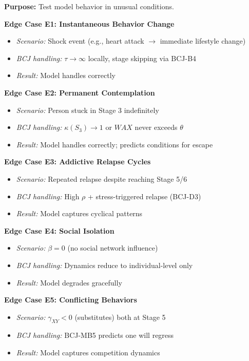 \begin{tcolorbox}[colback=gray!5!white, colframe=gray!75!black,
    title=Validation V7: Edge Cases]
\textbf{Purpose:} Test model behavior in unusual conditions.

\textbf{Edge Case E1: Instantaneous Behavior Change}
\begin{itemize}[nosep]
\item \textit{Scenario:} Shock event (e.g., heart attack $\to$ immediate lifestyle change)
\item \textit{BCJ handling:} $\tau \to \infty$ locally, stage skipping via BCJ-B4
\item \textit{Result:} Model handles correctly
\end{itemize}

\textbf{Edge Case E2: Permanent Contemplation}
\begin{itemize}[nosep]
\item \textit{Scenario:} Person stuck in Stage 3 indefinitely
\item \textit{BCJ handling:} $\kappa(S_3) \to 1$ or $WAX$ never exceeds $\theta$
\item \textit{Result:} Model handles correctly; predicts conditions for escape
\end{itemize}

\textbf{Edge Case E3: Addictive Relapse Cycles}
\begin{itemize}[nosep]
\item \textit{Scenario:} Repeated relapse despite reaching Stage 5/6
\item \textit{BCJ handling:} High $\rho$ + stress-triggered relapse (BCJ-D3)
\item \textit{Result:} Model captures cyclical patterns
\end{itemize}

\textbf{Edge Case E4: Social Isolation}
\begin{itemize}[nosep]
\item \textit{Scenario:} $\beta = 0$ (no social network influence)
\item \textit{BCJ handling:} Dynamics reduce to individual-level only
\item \textit{Result:} Model degrades gracefully
\end{itemize}

\textbf{Edge Case E5: Conflicting Behaviors}
\begin{itemize}[nosep]
\item \textit{Scenario:} $\gamma_{XY} < 0$ (substitutes) both at Stage 5
\item \textit{BCJ handling:} BCJ-MB5 predicts one will regress
\item \textit{Result:} Model captures competition dynamics
\end{itemize}
\end{tcolorbox}

